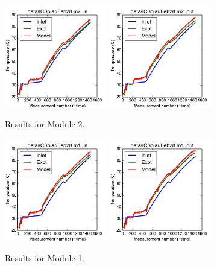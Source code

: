 \documentclass{article}
\begin{document}
\clearpage
\begin{figure}[!ht]
\centering
\includegraphics[width=0.4\textwidth]{../../data/ICSolar/images/Feb28_m2_in.pdf}\hspace{0.05\textwidth}
\includegraphics[width=0.4\textwidth]{../../data/ICSolar/images/Feb28_m2_out.pdf}\hspace{0.05\textwidth}\\
\caption{Results for Module 2.}\end{figure}
\begin{figure}[!ht]
\centering
\includegraphics[width=0.4\textwidth]{../../data/ICSolar/images/Feb28_m1_in.pdf}\hspace{0.05\textwidth}
\includegraphics[width=0.4\textwidth]{../../data/ICSolar/images/Feb28_m1_out.pdf}\hspace{0.05\textwidth}\\
\caption{Results for Module 1.}\end{figure}
\end{document}
